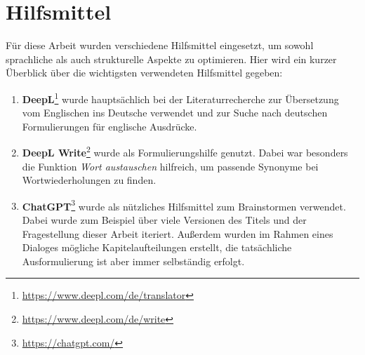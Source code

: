 \chapter*{Hilfsmittel}

Für diese Arbeit wurden verschiedene Hilfsmittel eingesetzt, um sowohl sprachliche als auch strukturelle Aspekte zu optimieren.
Hier wird ein kurzer Überblick über die wichtigsten verwendeten Hilfsmittel gegeben:

\begin{enumerate}
    
    \item \textbf{DeepL}\footnote{\url{https://www.deepl.com/de/translator}} wurde hauptsächlich bei der Literaturrecherche zur Übersetzung vom Englischen ins Deutsche verwendet und zur Suche nach deutschen Formulierungen für englische Ausdrücke.

    \item \textbf{DeepL Write}\footnote{\url{https://www.deepl.com/de/write}} wurde als Formulierungshilfe genutzt.
    Dabei war besonders die Funktion \textit{Wort austauschen} hilfreich, um passende Synonyme bei Wortwiederholungen zu finden.

    \item \textbf{ChatGPT}\footnote{\url{https://chatgpt.com/}} wurde als nützliches Hilfsmittel zum Brainstormen verwendet.
    Dabei wurde zum Beispiel über viele Versionen des Titels und der Fragestellung dieser Arbeit iteriert.
    Außerdem wurden im Rahmen eines Dialoges mögliche Kapitelaufteilungen erstellt, die tatsächliche Ausformulierung ist aber immer selbständig erfolgt.

\end{enumerate}